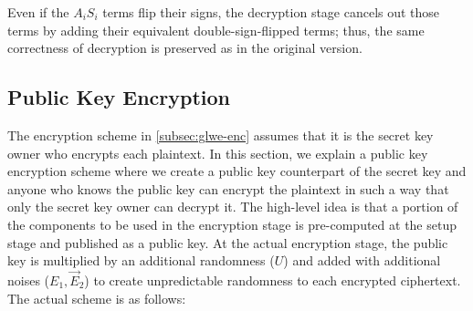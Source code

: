 Even if the $A_iS_i$ terms flip their signs, the decryption stage cancels out those terms by adding their equivalent double-sign-flipped terms; thus, the same correctness of decryption is preserved as in the original version.  





\subsection{Public Key Encryption}
\label{subsec:glwe-public-key-enc}


The encryption scheme in \autoref{subsec:glwe-enc} assumes that it is the secret key owner who encrypts each plaintext. In this section, we explain a public key encryption scheme where we create a public key counterpart of the secret key and anyone who knows the public key can encrypt the plaintext in such a way that only the secret key owner can decrypt it. The high-level idea is that a portion of the components to be used in the encryption stage is pre-computed at the setup stage and published as a public key. At the actual encryption stage, the public key is multiplied by an additional randomness ($U$) and added with additional noises ($E_1, \vec{E}_2$) to create unpredictable randomness to each encrypted ciphertext. The actual scheme is as follows: 

